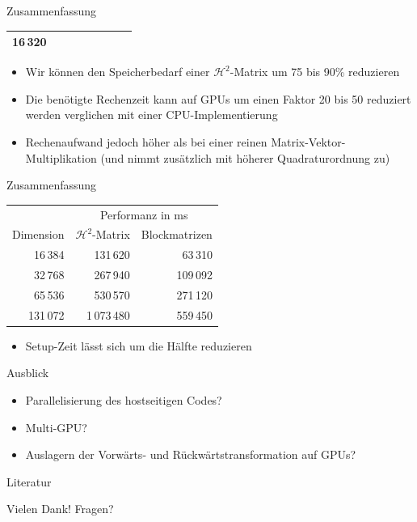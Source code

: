 \documentclass[10pt]{beamer}
\begin{document}
\begin{frame}{Zusammenfassung}
\begin{table}[ht]
{\begin{tabular}{rrrrrrrr}
         16\,320 \\
        \bottomrule
      \end{tabular}
    }
  \end{table}
  \begin{itemize}
    \item Wir können den Speicherbedarf einer \(\mathcal{H}^2\)-Matrix um
          75 bis 90\% reduzieren
    \item Die benötigte Rechenzeit kann auf GPUs um einen Faktor 20 bis 50
          reduziert werden verglichen mit einer CPU-Implementierung
    \item Rechenaufwand jedoch höher als bei einer reinen
          Matrix-Vektor-Multiplikation (und nimmt zusätzlich mit höherer
          Quadraturordnung zu)
  \end{itemize}
\end{frame}

\begin{frame}{Zusammenfassung}
  \small
  \begin{table}
    \begin{tabular}{rrr} \toprule
                & \multicolumn{2}{c}{Performanz in ms} \\ \cmidrule{2-3}
      Dimension & \(\mathcal{H}^2\)-Matrix & Blockmatrizen \\ \midrule
          16\,384 &                     131\,620 &   63\,310 \\
          32\,768 &                     267\,940 &  109\,092 \\
          65\,536 &                     530\,570 &  271\,120 \\
         131\,072 &                  1\,073\,480 &  559\,450 \\ \bottomrule
      \end{tabular}
    \end{table}
  \normalsize
  \begin{itemize}
    \item Setup-Zeit lässt sich um die Hälfte reduzieren
  \end{itemize}
\end{frame}

\begin{frame}{Ausblick}
  \begin{itemize}
    \item Parallelisierung des hostseitigen Codes?
    \item Multi-GPU\@?
    \item Auslagern der Vorwärts- und Rückwärtstransformation auf GPUs?
  \end{itemize}
\end{frame}
\begin{frame}[allowframebreaks]{Literatur}

  \printbibliography
  \nocite{*}

\end{frame}

\begin{frame}
  \Huge Vielen Dank! Fragen?
\end{frame}
\end{document}
